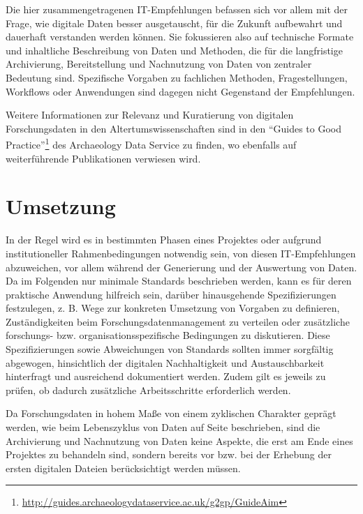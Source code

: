 Die hier zusammengetragenen IT-Empfehlungen befassen sich vor allem mit der Frage, wie digitale Daten besser ausgetauscht, für die Zukunft aufbewahrt und dauerhaft verstanden werden können. Sie fokussieren also auf technische Formate und inhaltliche Beschreibung von Daten und Methoden, die für die langfristige Archivierung, Bereitstellung und Nachnutzung von Daten von zentraler Bedeutung sind. Spezifische Vorgaben zu fachlichen Methoden, Fragestellungen, Workflows oder Anwendungen sind dagegen nicht Gegenstand der Empfehlungen.

Weitere Informationen zur Relevanz und Kuratierung von digitalen Forschungsdaten in den Altertumswissenschaften sind in den "`Guides to Good Practice"'\footnote{\url{http://guides.archaeologydataservice.ac.uk/g2gp/GuideAim}} des Archaeology Data Service zu finden, wo ebenfalls auf weiterführende Publikationen verwiesen wird. 


\section*{Umsetzung}
In der Regel wird es in bestimmten Phasen eines Projektes oder aufgrund institutioneller Rahmenbedingungen notwendig sein, von diesen IT-Empfehlungen abzuweichen, vor allem während der Generierung und der Auswertung von Daten. Da im Folgenden nur minimale Standards beschrieben werden, kann es für deren praktische Anwendung hilfreich sein, darüber hinausgehende Spezifizierungen festzulegen, z. B. Wege zur konkreten Umsetzung von Vorgaben zu definieren, Zuständigkeiten beim Forschungsdatenmanagement zu verteilen oder zusätzliche forschungs- bzw. organisationsspezifische Bedingungen zu diskutieren. Diese Spezifizierungen sowie Abweichungen von Standards sollten immer sorgfältig abgewogen, hinsichtlich der digitalen Nachhaltigkeit und Austauschbarkeit hinterfragt und ausreichend dokumentiert werden. Zudem gilt es jeweils zu prüfen, ob dadurch zusätzliche Arbeitsschritte erforderlich werden.

Da Forschungsdaten in hohem Maße von einem zyklischen Charakter geprägt werden, wie beim Lebenszyklus von Daten auf Seite \pageref{lebenszyklus} beschrieben, sind die Archivierung und Nachnutzung von Daten keine Aspekte, die erst am Ende eines Projektes zu behandeln sind, sondern bereits vor bzw. bei der Erhebung der ersten digitalen Dateien berücksichtigt werden müssen.

